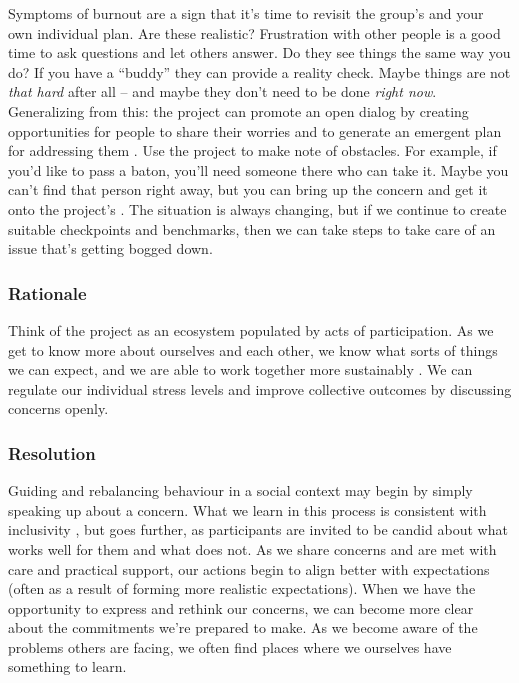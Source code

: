 Symptoms of burnout are a sign that it's time to revisit the group's  and your own individual plan.  Are these realistic?  Frustration with other people is a good time to ask questions and let others answer.  Do they see things the same way you do?   If you have a ``buddy'' they can provide a reality check.   Maybe things are not \emph{that hard} after all -- and maybe they don't need to be done \emph{right now}.  Generalizing from this: the project can promote an open dialog by creating opportunities for people to share their worries and to generate an emergent plan for addressing them \cite{seikkula2006dialogical}.  Use the project  to make note of obstacles.  For example, if you'd like to pass a baton, you'll need someone there who can take it.  Maybe you can't find that person right away, but you can bring up the concern and get it onto the project's .  The situation is always changing, but if we continue to create suitable checkpoints and benchmarks, then we can take steps to take care of an issue that's getting bogged down.    

\subsubsection*{Rationale}

Think of the project as an ecosystem populated by acts of participation.  As we get to know more about ourselves and each other, we know what sorts of things we can expect, and we are able to work together more sustainably \cite{ostrom2010revising}.
%
We can regulate our individual stress levels and improve collective outcomes by discussing concerns openly.

\subsubsection*{Resolution}

Guiding and rebalancing behaviour in a social context may begin by simply speaking up about a concern.  What we learn in this process is  consistent with inclusivity \cite{garrison2013toward}, but goes further, as participants are invited to be candid about what works well for them and what does not.
%
As we share concerns and are met with care and practical support, our actions begin to align better with expectations (often as a result of forming more realistic expectations).  When we have the opportunity to express and rethink our concerns, we can become more clear about the commitments we're prepared to make.  As we become aware of the problems others are facing, we often find places where we ourselves have something to learn.

